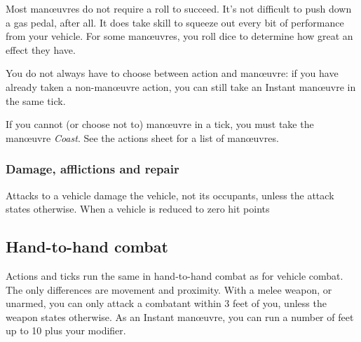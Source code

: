 \documentclass[10pt, a4paper, twocolumn]{article}
\begin{document}
Most man\oe{}uvres do not require a roll to succeed. It's not difficult to push
down a gas pedal, after all. It does take skill to squeeze out every bit of
performance from your vehicle. For some man\oe{}uvres, you roll dice to
determine how great an effect they have.

You do not always have to choose between action and man\oe{}uvre: if you have
already taken a non-man\oe{}uvre action, you can still take an Instant
man\oe{}uvre in the same tick.

If you cannot (or choose not to) man\oe{}uvre in a tick, you must take the
man\oe{}uvre \emph{Coast}. See the actions sheet for a list of man\oe{}uvres.

\subsubsection{Damage, afflictions and repair}
Attacks to a vehicle damage the vehicle, not its occupants, unless the attack
states otherwise. When a vehicle is reduced to zero hit points

\subsection{Hand-to-hand combat}

Actions and ticks run the same in hand-to-hand combat as for vehicle combat. The only
differences are movement and proximity. With a melee weapon, or unarmed, you can
only attack a combatant within 3 feet of you, unless the weapon states
otherwise. As an Instant man\oe{}uvre, you can run a number of feet up to 10
plus your  modifier. 
\end{document}
